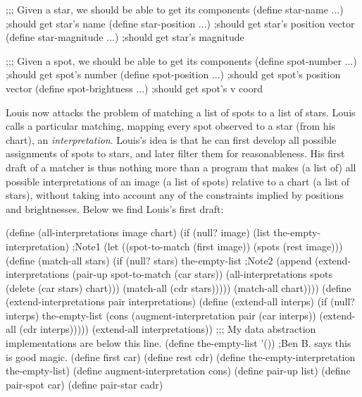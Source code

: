 \beginlisp
;;; Given a star, we should be able to get its components
\null
(define star-name ...)                               ;should get star's name
\null
(define star-position ...)                           ;should get star's position vector
\null
(define star-magnitude ...)                          ;should get star's magnitude
\null
\endlisp

\beginlisp
;;; Given a spot, we should be able to get its components
\null
(define spot-number ...)                             ;should get spot's number
\null
(define spot-position ...)                           ;should get spot's position vector
\null
(define spot-brightness ...)                         ;should get spot's v coord
\endlisp

\null

Louis now attacks the problem of matching a list of spots to a list of stars.
Louis calls a particular matching, mapping every spot observed to a star (from
his chart), an {\it interpretation}.  Louis's idea is that he can first develop
all possible assignments of spots to stars, and later filter them for
reasonableness.  His first draft of a matcher is thus nothing more than a
program that makes (a list of) all possible interpretations of an image (a list
of spots) relative to a chart (a list of stars), without taking into account
any of the constraints implied by positions and brightnesses.  Below we find
Louis's first draft:

\beginlisp
(define (all-interpretations image chart)
  (if (null? image)
      (list the-empty-interpretation)   ;Note1
      (let ((spot-to-match (first image))
            (spots (rest image)))
        (define (match-all stars)
          (if (null? stars)
              the-empty-list            ;Note2
              (append (extend-interpretations
                        (pair-up spot-to-match (car stars))
                        (all-interpretations spots
                                             (delete (car stars) chart)))
                      (match-all (cdr stars)))))
        (match-all chart))))
\null
(define (extend-interpretations pair interpretations)
  (define (extend-all interps)
    (if (null? interps)
        the-empty-list
        (cons (augment-interpretation pair (car interps))
              (extend-all (cdr interps)))))
  (extend-all interpretations))
\null
;;; My data abstraction implementations are below this line.
\null
(define the-empty-list '())     ;Ben B. says this is good magic.
(define first car)
(define rest cdr)
\null
(define the-empty-interpretation the-empty-list)
(define augment-interpretation cons)
\null
(define pair-up list)
(define pair-spot car)
(define pair-star cadr)
\endlisp

